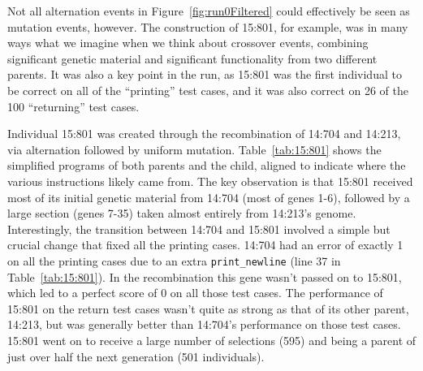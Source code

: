 \documentclass[graybox]{svmult}
\begin{document}
Not all alternation events in Figure~\ref{fig:run0Filtered} could effectively be seen as
mutation events, however. The construction of 15:801, for example,
was in many ways what we imagine when we think about
crossover events, combining significant genetic material and significant functionality from two different parents. It was also a key point in the run,
as 15:801 was the first individual to be correct on all of the ``printing''
test cases, and it was also correct on 26 of the 100 ``returning'' test cases.

Individual 15:801 was created through the recombination of 14:704 and 14:213,
via alternation followed by uniform mutation. 
Table~\ref{tab:15:801} shows the simplified programs of 
both parents and the child,
aligned to indicate where the various instructions likely came from. The key
observation is that 15:801 received most of its initial genetic material from 
14:704 (most of genes 1-6), followed by a large section (genes 7-35) taken
almost entirely from 14:213's genome. Interestingly, the transition between 14:704 and 15:801 involved a simple but crucial change that fixed all the
printing cases. 14:704 had an error of exactly 1 on all the printing cases
due to an extra \texttt{print\_newline} (line 37 in Table~\ref{tab:15:801}).
In the recombination this gene wasn't passed on to 15:801, which led to a
perfect score of 0 on all those test cases. The performance of 15:801 on
the return test cases wasn't quite as strong as that of its other parent,
14:213, but was generally better than 14:704's performance on those test cases. 15:801 went on to receive a large number of selections (595) and being
a parent of just over half the next generation (501 individuals).
\end{document}
